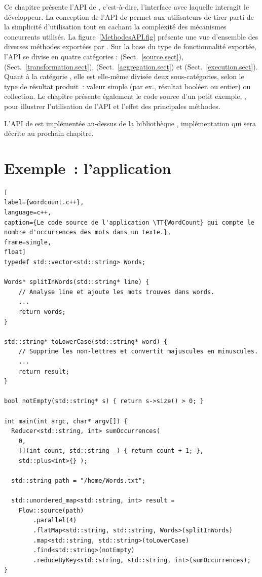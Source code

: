 Ce chapitre pr\'esente l'API de \ppff,  c'est-\`a-dire, l'interface avec laquelle interagit le d\'eveloppeur. La conception de l'API de \ppff{} permet aux utilisateurs de tirer parti de la simplicit\'e d'utilisation tout en cachant la complexit\'e des m\'ecanismes concurrents utilis\'es. La figure~\ref{MethodesAPI.fig} pr\'esente une vue d'ensemble des diverses m\'ethodes export\'ees par \ppff. Sur la base du type de fonctionnalit\'e export\'ee, l'API se divise en quatre cat\'egories :   (Sect.~\ref{source.sect}),  (Sect.~\ref{transformation.sect}),   (Sect.~\ref{aggregation.sect}) et  (Sect.~\ref{execution.sect}). Quant \`a la cat\'egorie , elle est elle-m\^eme divis\'ee deux sous-cat\'egories, selon le type de r\'esultat produit~: valeur simple (par ex., r\'esultat bool\'een ou entier) ou collection.
%
%
Le chapitre pr\'esente \'egalement le code source d'un petit exemple, , pour illustrer l'utilisation de l'API et l'effet des principales m\'ethodes.

L'{API} de \PpFf{} est impl\'ement\'ee au-dessus de la biblioth\`eque , impl\'ementation qui sera d\'ecrite au prochain chapitre.



\section{Exemple~: l'application }
\label{descriptionWordCount.sect}



\begin{lstlisting}[
label={wordcount.c++},
language=c++,
caption={Le code source de l'application \TT{WordCount} qui compte le nombre d'occurrences des mots dans un texte.},
frame=single,
float]
typedef std::vector<std::string> Words;

Words* splitInWords(std::string* line) {
    // Analyse line et ajoute les mots trouves dans words.
    ...
    return words;
}

std::string* toLowerCase(std::string* word) {
    // Supprime les non-lettres et convertit majuscules en minuscules.
    ...
    return result;
}

bool notEmpty(std::string* s) { return s->size() > 0; }

int main(int argc, char* argv[]) {
  Reducer<std::string, int> sumOccurrences(
    0, 
    [](int count, std::string _) { return count + 1; },
    std::plus<int>{} );

  std::string path = "/home/Words.txt"; 

  std::unordered_map<std::string, int> result = 
    Flow::source(path) 
        .parallel(4)
        .flatMap<std::string, std::string, Words>(splitInWords)
        .map<std::string, std::string>(toLowerCase)
        .find<std::string>(notEmpty)
        .reduceByKey<std::string, std::string, int>(sumOccurrences);
}
\end{lstlisting}


